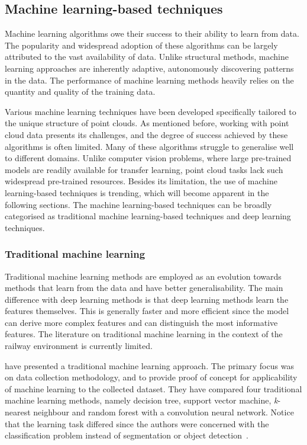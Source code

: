 \subsection{Machine learning-based techniques}
Machine learning algorithms owe their success to their ability to learn from data. The popularity and widespread adoption of these algorithms can be largely attributed to the vast availability of data. Unlike structural methods, machine learning approaches are inherently adaptive, autonomously discovering patterns in the data. The performance of machine learning methods heavily relies on the quantity and quality of the training data. 

Various machine learning techniques have been developed specifically tailored to the unique structure of point clouds. As mentioned before, working with point cloud data presents its challenges, and the degree of success achieved by these algorithms is often limited. Many of these algorithms struggle to generalise well to different domains. Unlike computer vision problems, where large pre-trained models are readily available for transfer learning, point cloud tasks lack such widespread pre-trained resources. Besides its limitation, the use of machine learning-based techniques is trending, which will become apparent in the following sections. The machine learning-based techniques can be broadly categorised as traditional machine learning-based techniques and deep learning techniques. 
\subsubsection{Traditional machine learning}
Traditional machine learning methods are employed as an evolution towards methods that learn from the data and have better generalisability. The main difference with deep learning methods is that deep learning methods learn the features themselves. This is generally faster and more efficient since the model can derive more complex features and can distinguish the most informative features. 
The literature on traditional machine learning in the context of the railway environment is currently limited. 

\citeauthor{sturari2017robotic} have presented a traditional machine learning approach. The primary focus was on data collection methodology, and to provide proof of concept for applicability of machine learning to the collected dataset. They have compared four traditional machine learning methods, namely decision tree, support vector machine, \textit{k}-nearest neighbour and random forest with a convolution neural network. Notice that the learning task differed since the authors were concerned with the classification problem instead of segmentation or object detection~\cite{sturari2017robotic}. 

